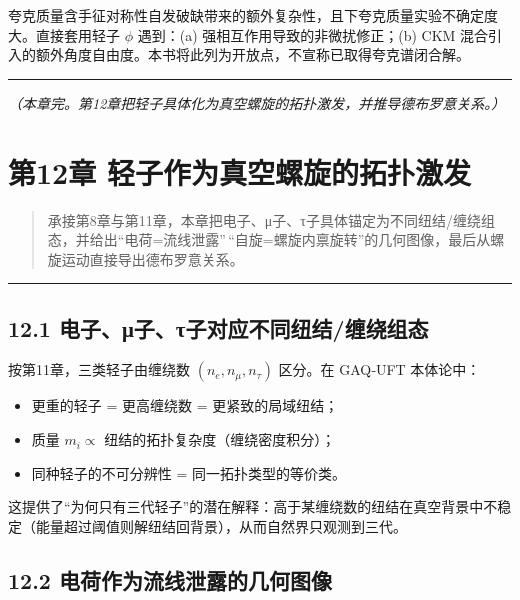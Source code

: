 夸克质量含手征对称性自发破缺带来的额外复杂性，且下夸克质量实验不确定度大。直接套用轻子
\(\phi\) 遇到：(a) 强相互作用导致的非微扰修正；(b) CKM
混合引入的额外角度自由度。本书将此列为开放点，不宣称已取得夸克谱闭合解。

\begin{center}\rule{0.5\linewidth}{0.5pt}\end{center}

\emph{（本章完。第12章把轻子具体化为真空螺旋的拓扑激发，并推导德布罗意关系。）}

\section{第12章
轻子作为真空螺旋的拓扑激发}\label{ux7b2c12ux7ae0-ux8f7bux5b50ux4f5cux4e3aux771fux7a7aux87baux65cbux7684ux62d3ux6251ux6fc0ux53d1-1}

\begin{quote}
承接第8章与第11章，本章把电子、μ子、τ子具体锚定为不同纽结/缠绕组态，并给出``电荷=流线泄露''\,``自旋=螺旋内禀旋转''的几何图像，最后从螺旋运动直接导出德布罗意关系。
\end{quote}

\begin{center}\rule{0.5\linewidth}{0.5pt}\end{center}

\subsection{12.1
电子、μ子、τ子对应不同纽结/缠绕组态}\label{ux7535ux5b50ux3bcux5b50ux3c4ux5b50ux5bf9ux5e94ux4e0dux540cux7ebdux7ed3ux7f20ux7ed5ux7ec4ux6001}

按第11章，三类轻子由缠绕数 \((n_e,n_\mu,n_\tau)\) 区分。在 GAQ‑UFT
本体论中：

\begin{itemize}
\tightlist
\item
  更重的轻子 = 更高缠绕数 = 更紧致的局域纽结；
\item
  质量 \(m_i\propto\) 纽结的拓扑复杂度（缠绕密度积分）；
\item
  同种轻子的不可分辨性 = 同一拓扑类型的等价类。
\end{itemize}

这提供了``为何只有三代轻子''的潜在解释：高于某缠绕数的纽结在真空背景中不稳定（能量超过阈值则解纽结回背景），从而自然界只观测到三代。

\subsection{12.2
电荷作为流线泄露的几何图像}\label{ux7535ux8377ux4f5cux4e3aux6d41ux7ebfux6cc4ux9732ux7684ux51e0ux4f55ux56feux50cf}

